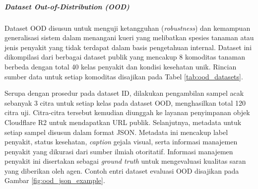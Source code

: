 \subparagraph{\textit{Dataset Out-of-Distribution} (OOD)}
Dataset OOD disusun untuk menguji ketangguhan (\textit{robustness}) dan kemampuan generalisasi sistem dalam menangani kueri yang melibatkan spesies tanaman atau jenis penyakit yang tidak terdapat dalam basis pengetahuan internal. Dataset ini dikompilasi dari berbagai dataset publik yang mencakup 8 komoditas tanaman berbeda dengan total 40 kelas penyakit dan kondisi kesehatan unik. Rincian sumber data untuk setiap komoditas disajikan pada Tabel \ref{tab:ood_datasets}.

\begin{table}[H]
    \centering
    \caption{\textit{Rincian Dataset Out-of-Distribution} (OOD)}
    \label{tab:ood_datasets}
    \small
\end{table}

Serupa dengan prosedur pada dataset ID, dilakukan pengambilan sampel acak sebanyak 3 citra untuk setiap kelas pada dataset OOD, menghasilkan total 120 citra uji. Citra-citra tersebut kemudian diunggah ke layanan penyimpanan objek Cloudflare R2 untuk mendapatkan URL publik. Selanjutnya, metadata untuk setiap sampel disusun dalam format JSON. Metadata ini mencakup label penyakit, status kesehatan, \textit{caption} gejala visual, serta informasi manajemen penyakit yang dikurasi dari sumber ilmiah otoritatif. Informasi manajemen penyakit ini disertakan sebagai \textit{ground truth} untuk mengevaluasi kualitas saran yang diberikan oleh agen. Contoh entri dataset evaluasi OOD disajikan pada Gambar \ref{fig:ood_json_example}.

